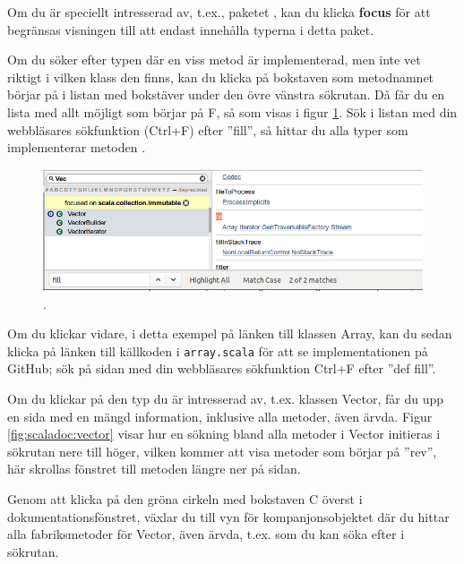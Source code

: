 Om du är speciellt intresserad av, t.ex., paketet , kan du klicka \textbf{focus} för att begränsas visningen till att endast innehålla typerna i detta paket.

Om du söker efter typen där en viss metod är implementerad, men inte vet riktigt i vilken klass den finns, kan du klicka på bokstaven som metodnamnet börjar på i listan med bokstäver under den övre vänstra sökrutan. Då får du en lista med allt möjligt som börjar på F, så som visas i figur \ref{fig:scaladoc:find}. Sök i listan med din webbläsares sökfunktion (Ctrl+F) efter ''fill'', så hittar du alla typer som implementerar metoden . 

\begin{figure}[H]
\centering
\includegraphics[width=1.0\textwidth]{../img/scaladoc/scaladoc-find-fill}

     \caption{ \scaladoc.}
    \label{fig:scaladoc:find}
\end{figure}

Om du klickar vidare, i detta exempel på länken till klassen Array, kan du sedan klicka på länken till källkoden i \texttt{array.scala} för att se implementationen på GitHub; sök på sidan med din webbläsares sökfunktion Ctrl+F efter ''def fill''.





Om du klickar på den typ du är intresserad av, t.ex. klassen Vector, får du upp en sida med en mängd information, inklusive alla metoder, även ärvda. Figur \ref{fig:scaladoc:vector} visar hur en sökning bland alla metoder i Vector initieras i sökrutan nere till höger, vilken kommer att visa metoder som börjar på ''rev'', här skrollas fönstret till metoden  längre ner på sidan.

Genom att klicka på den gröna cirkeln med bokstaven C överst i dokumentationsfönstret, växlar du till vyn för kompanjonsobjektet där du hittar alla fabriksmetoder för Vector, även ärvda, t.ex.  som du kan söka efter i sökrutan. 



